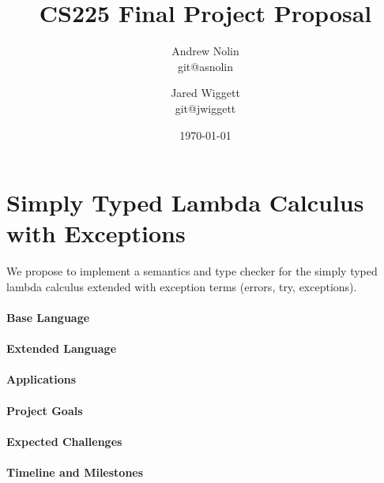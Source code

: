 \documentclass{article}
\title{CS225 Final Project Proposal}
\author{Andrew Nolin \\ git@asnolin \and Jared Wiggett \\ git@jwiggett}
\date{\today}
\begin{document}
\maketitle
\section*{Simply Typed Lambda Calculus with Exceptions}
We propose to implement a semantics and type checker for the simply typed lambda calculus extended with exception terms (errors, try, exceptions). 


\paragraph{Base Language}

\paragraph{Extended Language}

\paragraph{Applications}

\paragraph{Project Goals}

\paragraph{Expected Challenges}

\paragraph{Timeline and Milestones}
\end{document}

